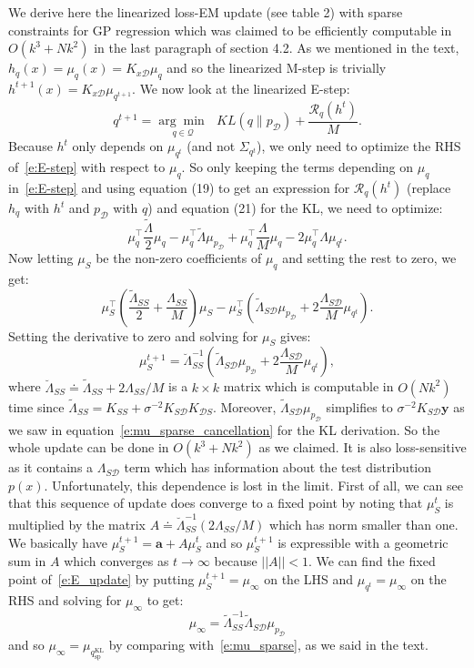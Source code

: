 \documentclass{article}
\newcommand{\dataset}{\mathcal{D}}
\newcommand{\argmin}[1]{\underset{#1}{\arg\min\:}}
\begin{document}
We derive here the linearized loss-EM update (see table 2) with sparse constraints for GP regression which was claimed to be efficiently computable in $O(k^3+N k^2)$ in the last paragraph of section 4.2. As we mentioned in the text, $h_q(x) = \mu_q(x) = K_{x\dataset}\mu_q$ and so the linearized M-step is trivially $h^{t+1}(x) = K_{x\dataset}\mu_{q^{t+1}}$. We now look at the linearized E-step:
\begin{equation} \label{e:E-step}
    q^{t+1}  =  \argmin{q \in \mathcal{Q}} \:\: KL\left( q \| p_\dataset \right) + \frac{\mathcal{R}_{q}(h^t)}{M}.
\end{equation}
Because $h^{t}$ only depends on $\mu_{q^{t}}$ (and not $\Sigma_{q^{t}}$), we only need to optimize the RHS of~\eqref{e:E-step} with respect to $\mu_q$. So only keeping the terms depending on $\mu_q$ in~\eqref{e:E-step} and using equation (19) to get an expression for $\mathcal{R}_{q}(h^t)$ (replace $h_q$ with $h^t$ and $p_\dataset$ with $q$) and equation (21) for the KL, we need to optimize:
$$
    \mu_q^\top \frac{\tilde{\Lambda}}{2} \mu_q - \mu_q^\top \tilde{\Lambda} \mu_{p_\dataset} + \mu_q^\top \frac{\Lambda}{M} \mu_q - 2 \mu_q^\top \Lambda \mu_{q^{t}} .
$$
Now letting $\mu_S$ be the non-zero coefficients of $\mu_q$ and setting the rest to zero, we get:
$$
    \mu_S^\top \left(\frac{\tilde{\Lambda}_{SS}}{2} + \frac{\Lambda_{SS}}{M} \right) \mu_S - \mu_S^\top \left(\tilde{\Lambda}_{S\dataset} \mu_{p_\dataset}  + 2\frac{\Lambda_{S\dataset}}{M} \mu_{q^{t}} \right) .
$$
Setting the derivative to zero and solving for $\mu_S$ gives:
\begin{equation} \label{e:E_update}
    \mu_S^{t+1} = \breve{\Lambda}_{SS}^{-1} \left(\tilde{\Lambda}_{S\dataset} \mu_{p_\dataset}  + 2\frac{\Lambda_{S\dataset}}{M} \mu_{q^{t}} \right),
\end{equation}
where $\breve{\Lambda}_{SS} \doteq \tilde{\Lambda}_{SS} + 2\Lambda_{SS}/M$ is a $k\times k$ matrix which is computable in $O(N k^2)$ time since $\tilde{\Lambda}_{SS} = K_{SS} + \sigma^{-2} K_{S\dataset} K_{\dataset S}$. Moreover, $\tilde{\Lambda}_{S\dataset} \mu_{p_\dataset}$ simplifies to $\sigma^{-2} K_{S\dataset} \mathbf{y}$ as we saw in equation~\eqref{e:mu_sparse_cancellation} for the KL derivation. So the whole update can be done in $O(k^3+N k^2)$ as we claimed. It is also loss-sensitive as it contains a $\Lambda_{S\dataset}$ term which has information about the test distribution $p(x)$. Unfortunately, this dependence is lost in the limit. First of all, we can see that this sequence of update does converge to a fixed point by noting that $\mu_S^t$ is multiplied by the matrix $A \doteq \breve{\Lambda}_{SS}^{-1} (2 \Lambda_{SS}/M)$ which has norm smaller than one. We basically have $\mu_S^{t+1} = \mathbf{a} + A \mu_S^{t}$ and so $\mu_S^{t+1}$ is expressible with a geometric sum in $A$ which converges as $t \rightarrow \infty$ because $||A||<1$. We can find the fixed point of~\eqref{e:E_update} by putting $\mu_S^{t+1} = \mu_{\infty}$ on the LHS and $\mu_{q^t} = \mu_{\infty}$ on the RHS and solving for $\mu_{\infty}$ to get:
$$
    \mu_{\infty} = \tilde{\Lambda}_{SS}^{-1}\tilde{\Lambda}_{S\dataset}\mu_{p_{\dataset}}
$$
and so $\mu_{\infty} = \mu_{q_{\mathrm{sp}}^{\mathrm{KL}}}$ by comparing with~\eqref{e:mu_sparse}, as we said in the text.
\end{document}
